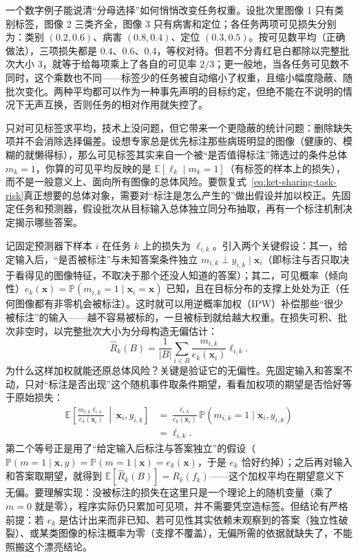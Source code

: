 一个数字例子能说清“分母选择”如何悄悄改变任务权重。设批次里图像 1 只有类别标签，图像 2 三类齐全，图像 3 只有病害和定位；各任务两项可见损失分别为：类别 $(0.2,0.6)$、病害 $(0.8,0.4)$、定位 $(0.3,0.5)$。按可见数平均（正确做法），三项损失都是 $0.4$、$0.6$、$0.4$，等权对待。但若不分青红皂白都除以完整批次大小 3，就等于给每项乘上了各自的可见率 $2/3$；更一般地，当各任务可见数不同时，这个乘数也不同——标签少的任务被自动缩小了权重，且缩小幅度隐蔽、随批次变化。两种平均都可以作为一种事先声明的目标约定，但绝不能在不说明的情况下无声互换，否则任务的相对作用就失控了。

只对可见标签求平均，技术上没问题，但它带来一个更隐蔽的统计问题：删除缺失项并不会消除选择偏差。设想专家总是优先标注那些病斑明显的图像（健康的、模糊的就懒得标），那么可见标签其实来自一个被“是否值得标注”筛选过的条件总体 $m_k=1$，你算的可见平均反映的是 $\mathbb E[\ell_k\mid m_k=1]$（有标签的样本上的损失），而不是一般意义上、面向所有图像的总体风险。要恢复式~\eqref{eq:ket-sharing-task-risk}真正想要的总体对象，需要对“标注是怎么产生的”做出假设并加以校正。先固定任务和预测器，假设批次从目标输入总体独立同分布抽取，再有一个标注机制决定揭示哪些答案。

记固定预测器下样本 $i$ 在任务 $k$ 上的损失为 $\ell_{i,k}$。引入两个关键假设：其一，给定输入后，“是否被标注”与未知答案条件独立 $m_{i,k}\perp y_{i,k}\mid\bm x_i$（即标注与否只取决于看得见的图像特征，不取决于那个还没人知道的答案）；其二，可见概率（倾向性）$e_k(\bm x)=\mathbb P(m_{i,k}=1\mid\bm x_i=\bm x)$ 已知，且在目标分布的支撑上处处为正（任何图像都有非零机会被标注）。这时就可以用逆概率加权（IPW）补偿那些“很少被标注”的输入——越不容易被标的，一旦被标到就给越大权重。在损失可积、批次非空时，以完整批次大小为分母构造无偏估计：
\begin{equation}
  \widehat R_k(B)=\frac{1}{|B|}
    \sum_{i\in B}\frac{m_{i,k}}{e_k(\bm x_i)}\ell_{i,k}.
  \label{eq:ket-sharing-label-ipw}
\end{equation}
为什么这样加权就能还原总体风险？关键是验证它的无偏性。先固定输入和答案不动，只对“标注是否出现”这个随机事件取条件期望，看看加权项的期望是否恰好等于原始损失：
\begin{align}
  \mathbb E\!\left[
    \frac{m_{i,k}\ell_{i,k}}{e_k(\bm x_i)}
    \,\middle|\,\bm x_i,y_{i,k}\right]
  &=\frac{\ell_{i,k}}{e_k(\bm x_i)}
    \mathbb P(m_{i,k}=1\mid\bm x_i,y_{i,k})
  \nonumber\\
  &=\ell_{i,k}.
  \label{eq:ket-sharing-label-ipw-expectation}
\end{align}
第二个等号正是用了“给定输入后标注与答案独立”的假设（$\mathbb P(m=1\mid\bm x,y)=\mathbb P(m=1\mid\bm x)=e_k(\bm x)$，于是 $e_k$ 恰好约掉）；之后再对输入和答案取期望，就得到 $\mathbb E[\widehat R_k(B)]=R_k(f_k)$——这个加权平均在期望意义下无偏。要理解实现：没被标注的损失在这里只是一个理论上的随机变量（乘了 $m=0$ 就是零），程序实际仍只累加可见项，并不需要凭空造标签。但结论有严格前提：若 $e_k$ 是估计出来而非已知、若可见性其实依赖未观察到的答案（独立性破裂）、或某类图像的标注概率为零（支撑不覆盖），无偏所需的依据就缺失了，不能照搬这个漂亮结论。

